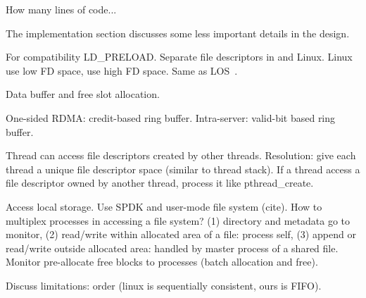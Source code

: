 \label{subsrc:ringbuffer}
How many lines of code...

The implementation section discusses some less important details in the design.


For compatibility
LD\_PRELOAD.
Separate file descriptors in \sys and Linux. Linux use low FD space, \sys use high FD space. Same as LOS~\cite{huang2017high}.

% 
% 
% 
Data buffer and free slot allocation.

One-sided  RDMA: credit-based ring buffer. Intra-server: valid-bit based ring buffer.


Thread can access file descriptors created by other threads. Resolution: give each thread a unique file descriptor space (similar to thread stack). If a thread access a file descriptor owned by another thread, process it like pthread\_create.

Access local storage. Use SPDK and user-mode file system (cite). How to multiplex processes in accessing a file system? (1) directory and metadata go to monitor, (2) read/write within allocated area of a file: process self, (3) append or read/write outside allocated area: handled by master process of a shared file. Monitor pre-allocate free blocks to processes (batch allocation and free).

Discuss limitations: order (linux is sequentially consistent, ours is FIFO).